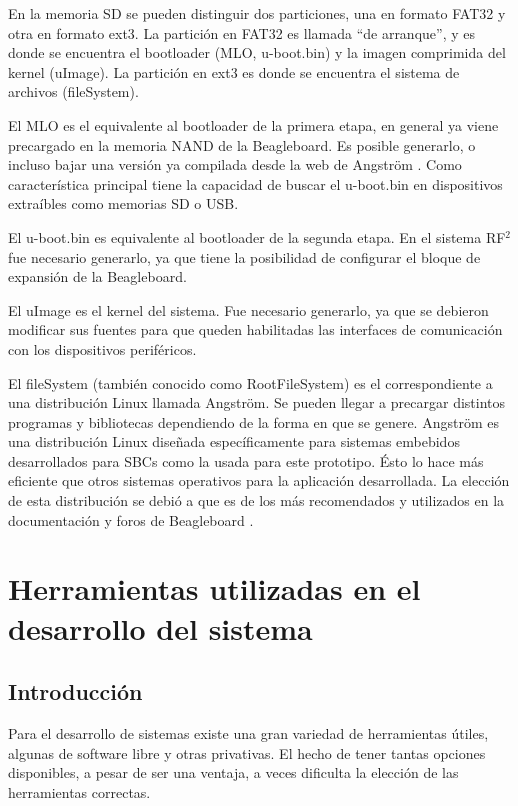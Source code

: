 En la memoria SD se pueden distinguir dos particiones, una en formato FAT32 y otra
en formato ext3. La partición en FAT32 es llamada “de arranque”, y es donde se encuentra 
el bootloader (MLO, u-boot.bin) y la imagen comprimida del kernel (uImage). 
La partición en ext3 es donde se encuentra el sistema de archivos (fileSystem).

El MLO es el equivalente al bootloader de la primera etapa, en general ya viene precargado en la memoria NAND de la Beagleboard. Es posible generarlo, o incluso bajar una versión ya compilada desde la web de Angström \cite{Angs}. Como característica principal tiene la capacidad de buscar el u-boot.bin en dispositivos extraíbles como memorias SD o USB.

El u-boot.bin es equivalente al bootloader de la segunda etapa. En el sistema RF$^{2}$ fue necesario generarlo, ya que tiene la posibilidad de configurar el bloque de expansión de la Beagleboard.

El uImage es el kernel del sistema. Fue necesario generarlo, ya que se debieron modificar sus fuentes para que queden habilitadas las interfaces de comunicación con los dispositivos periféricos.

El fileSystem (también conocido como RootFileSystem) es el correspondiente a una distribución Linux llamada Angström. Se pueden llegar a precargar distintos programas y bibliotecas dependiendo de la forma en que se genere.
Angström es una distribución Linux diseñada específicamente para sistemas embebidos desarrollados
para SBCs como la usada para este prototipo. Ésto lo hace más eficiente que otros sistemas operativos para la aplicación desarrollada. La elección de esta distribución se debió a que es de los más recomendados y utilizados en la documentación y foros de Beagleboard \cite{foroBb}.


\section{Herramientas utilizadas en el desarrollo del sistema}

\subsection{Introducción}
Para el desarrollo de sistemas existe una gran variedad de herramientas útiles, algunas de software libre y otras privativas. El hecho de tener tantas opciones disponibles, a pesar de ser una ventaja, a veces dificulta la elección de las herramientas correctas.

